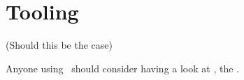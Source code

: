 \chapter{Tooling}
(Should this be the case)

Anyone using \Latex\ should consider having a look at \TUG,
the .